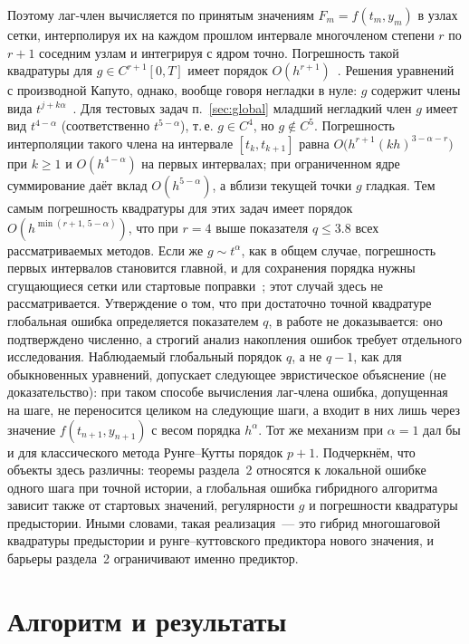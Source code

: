 \documentclass[11pt,a4paper]{article}
\theoremstyle{plain}
\theoremstyle{definition}
\begin{document}
Поэтому лаг-член вычисляется по принятым значениям $F_m=f(t_m,y_m)$ в узлах сетки, интерполируя их на каждом прошлом интервале многочленом степени $r$ по $r+1$ соседним узлам и интегрируя с ядром точно. Погрешность такой квадратуры для $g\in C^{r+1}[0,T]$ имеет порядок $O(h^{r+1})$~\cite{Brunner2004,Diethelm2010}. Решения уравнений с производной Капуто, однако, вообще говоря негладки в нуле: $g$ содержит члены вида $t^{j+k\alpha}$~\cite{Lubich1983}. Для тестовых задач п.~\ref{sec:global} младший негладкий член $g$ имеет вид $t^{4-\alpha}$ (соответственно $t^{5-\alpha}$), т.\,е. $g\in C^4$, но $g\notin C^5$. Погрешность интерполяции такого члена на интервале $[t_k,t_{k+1}]$ равна $O\bigl(h^{r+1}(kh)^{3-\alpha-r}\bigr)$ при $k\ge1$ и $O(h^{4-\alpha})$ на первых интервалах; при ограниченном ядре суммирование даёт вклад $O(h^{5-\alpha})$, а вблизи текущей точки $g$ гладкая. Тем самым погрешность квадратуры для этих задач имеет порядок $O(h^{\min(r+1,\,5-\alpha)})$, что при $r=4$ выше показателя $q\le3.8$ всех рассматриваемых методов. Если же $g\sim t^{\alpha}$, как в общем случае, погрешность первых интервалов становится главной, и для сохранения порядка нужны сгущающиеся сетки или стартовые поправки~\cite{Lubich1983}; этот случай здесь не рассматривается. Утверждение о том, что при достаточно точной квадратуре глобальная ошибка определяется показателем $q$, в работе не доказывается: оно подтверждено численно, а строгий анализ накопления ошибок требует отдельного исследования. Наблюдаемый глобальный порядок $q$, а не $q-1$, как для обыкновенных уравнений, допускает следующее эвристическое объяснение (не доказательство): при таком способе вычисления лаг-члена ошибка, допущенная на шаге, не переносится целиком на следующие шаги, а входит в них лишь через значение $f(t_{n+1},y_{n+1})$ с весом порядка $h^{\alpha}$. Тот же механизм при $\alpha=1$ дал бы и для классического метода Рунге--Кутты порядок $p+1$. Подчеркнём, что объекты здесь различны: теоремы раздела~2 относятся к локальной ошибке одного шага при точной истории, а глобальная ошибка гибридного алгоритма зависит также от стартовых значений, регулярности $g$ и погрешности квадратуры предыстории. Иными словами, такая реализация~--- это гибрид многошаговой квадратуры предыстории и рунге--куттовского предиктора нового значения, и барьеры раздела~2 ограничивают именно предиктор.

\section{Алгоритм и результаты}
\end{document}
